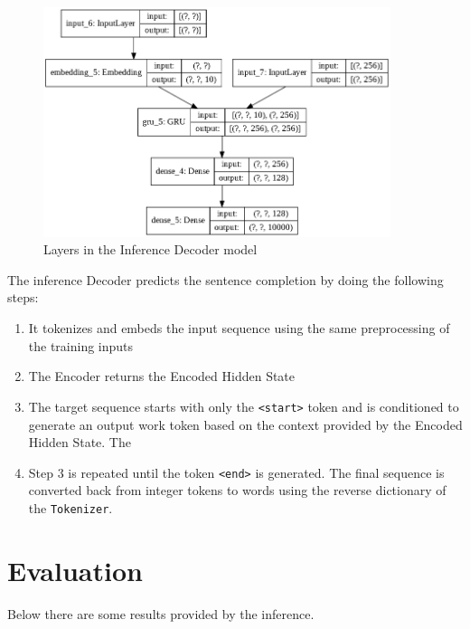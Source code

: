 \documentclass{article}
\begin{document}
\begin{figure}[htbp]
\centering
\includegraphics[width=4in]{images/inf-model.png}
\caption{Layers in the Inference Decoder model}
\label{inf-model}
\end{figure}

The inference Decoder predicts the sentence completion by doing the following steps:

\begin{enumerate}
\item
  It tokenizes and embeds the input sequence using the same preprocessing of the training inputs
\item
  The Encoder returns the Encoded Hidden State
\item
  The target sequence starts with only the \texttt{\textless{}start\textgreater{}} token and is conditioned to generate an output work token based on the context provided by the Encoded Hidden State. The
\item
  Step 3 is repeated until the token \texttt{\textless{}end\textgreater{}} is generated. The final sequence is converted back from integer tokens to words using the reverse dictionary of the \texttt{Tokenizer}.
\end{enumerate}

\section{Evaluation}\label{evaluation}

Below there are some results provided by the inference.
\end{document}
